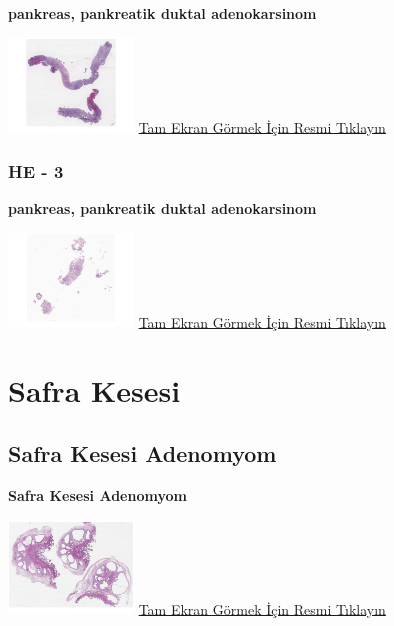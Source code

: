 \documentclass[
  letterpaper,
  DIV=11,
  numbers=noendperiod]{scrreprt}
\begin{document}
\textbf{pankreas, pankreatik duktal adenokarsinom}

\href{https://images.patolojiatlasi.com/PDAC-tru-cut/HE2.html}{\includegraphics[width=0.25\textwidth,height=\textheight]{./screenshots/thumbnail_PDAC-tru-cut-2.png}}
\href{https://images.patolojiatlasi.com/PDAC-tru-cut/HE2.html}{Tam Ekran
Görmek İçin Resmi Tıklayın}

\hypertarget{he---3-2}{%
\subsection{HE - 3}\label{he---3-2}}

\textbf{pankreas, pankreatik duktal adenokarsinom}

\href{https://images.patolojiatlasi.com/PDAC-tru-cut/HE3.html}{\includegraphics[width=0.25\textwidth,height=\textheight]{./screenshots/thumbnail_PDAC-tru-cut-3.png}}
\href{https://images.patolojiatlasi.com/PDAC-tru-cut/HE3.html}{Tam Ekran
Görmek İçin Resmi Tıklayın}

\hypertarget{sec-safra-kesesi}{%
\chapter{Safra Kesesi}\label{sec-safra-kesesi}}

\hypertarget{sec-safra-kesesi-adenomyom}{%
\section{Safra Kesesi Adenomyom}\label{sec-safra-kesesi-adenomyom}}

\textbf{Safra Kesesi Adenomyom}

\href{https://images.patolojiatlasi.com/gallbladder-adenomyoma/HE.html}{\includegraphics[width=0.25\textwidth,height=\textheight]{./screenshots/thumbnail_gallbladder-adenomyoma.png}}
\href{https://images.patolojiatlasi.com/gallbladder-adenomyoma/HE.html}{Tam
Ekran Görmek İçin Resmi Tıklayın}
\end{document}
